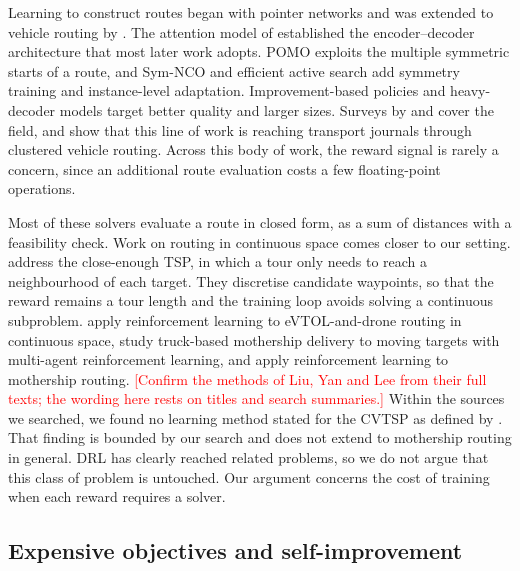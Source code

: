 \documentclass[preprint,12pt,authoryear]{elsarticle}
\newcommand{\placeholder}[1]{\textcolor{red}{[#1]}}
\begin{document}
Learning to construct routes began with pointer networks \citep{vinyals2015} and was extended to vehicle routing by \citet{nazari2018}. The attention model of \citet{kool2019} established the encoder--decoder architecture that most later work adopts. POMO \citep{kwon2020} exploits the multiple symmetric starts of a route, and Sym-NCO \citep{kim2022} and efficient active search \citep{hottung2022} add symmetry training and instance-level adaptation. Improvement-based policies \citep{wu2022} and heavy-decoder models \citep{luo2023} target better quality and larger sizes. Surveys by \citet{bengio2021} and \citet{mazyavkina2021} cover the field, and \citet{wuy2026} show that this line of work is reaching transport journals through clustered vehicle routing. Across this body of work, the reward signal is rarely a concern, since an additional route evaluation costs a few floating-point operations.

Most of these solvers evaluate a route in closed form, as a sum of distances with a feasibility check. Work on routing in continuous space comes closer to our setting. \citet{fan2025} address the close-enough TSP, in which a tour only needs to reach a neighbourhood of each target. They discretise candidate waypoints, so that the reward remains a tour length and the training loop avoids solving a continuous subproblem. \citet{liu2026} apply reinforcement learning to eVTOL-and-drone routing in continuous space, \citet{yan2026} study truck-based mothership delivery to moving targets with multi-agent reinforcement learning, and \citet{lee2023} apply reinforcement learning to mothership routing. \placeholder{Confirm the methods of Liu, Yan and Lee from their full texts; the wording here rests on titles and search summaries.} Within the sources we searched, we found no learning method stated for the CVTSP as defined by \citet{garone2011}. That finding is bounded by our search and does not extend to mothership routing in general. DRL has clearly reached related problems, so we do not argue that this class of problem is untouched. Our argument concerns the cost of training when each reward requires a solver.

\subsection{Expensive objectives and self-improvement}
\end{document}

